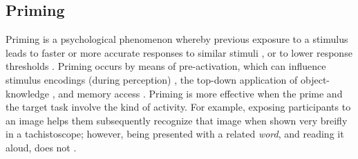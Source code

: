 \documentclass{sigchi}
\begin{document}
%
%
%

\subsection{Priming}
Priming is a psychological phenomenon whereby previous exposure to a 
stimulus leads to faster or more accurate responses to similar stimuli 
\cite{Ghuman17062008},
or to lower response thresholds \cite{BJOP1826}.  
Priming occurs by means of pre-activation, which can influence
stimulus encodings (during perception) \cite{BJOP1826}, 
the top-down application of object-knowledge \cite{Ghuman17062008},
and memory access \cite{beller1971priming}.
Priming is more 
effective when the prime and the target task involve the kind of 
activity.  For example, exposing participants to an image helps them 
subsequently recognize that image when shown very breifly in a 
tachistoscope; however, being presented with a related \textit{word}, 
and reading it aloud, does not \cite{BJOP1796}.
\end{document}
